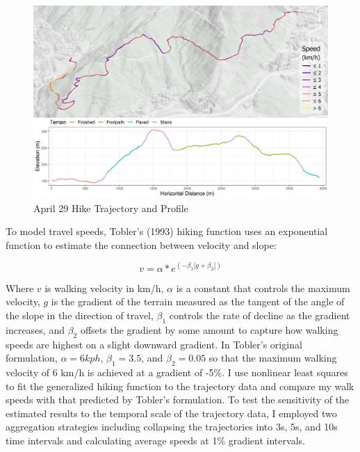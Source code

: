 \documentclass{article}
\begin{document}
\begin{figure}
\includegraphics[width=1\linewidth]{./img/Fig_1} \caption{April 29 Hike Trajectory and Profile}\label{fig:fig 1}
\end{figure}

To model travel speeds, Tobler's (1993) hiking function uses an
exponential function to estimate the connection between velocity and
slope:

\[
v = \alpha * e^{(-\beta_1 |g + \beta_2|)}
\]

Where \(v\) is walking velocity in km/h, \(\alpha\) is a constant that
controls the maximum velocity, \(g\) is the gradient of the terrain
measured as the tangent of the angle of the slope in the direction of
travel, \(\beta_1\) controls the rate of decline as the gradient
increases, and \(\beta_2\) offsets the gradient by some amount to
capture how walking speeds are highest on a slight downward gradient. In
Tobler's original formulation, \(\alpha = 6 kph\), \(\beta_1 = 3.5\),
and \(\beta_2 = 0.05\) so that the maximum walking velocity of 6 km/h is
achieved at a gradient of -5\%. I use nonlinear least squares to fit the
generalized hiking function to the trajectory data and compare my walk
speeds with that predicted by Tobler's formulation. To test the
sensitivity of the estimated results to the temporal scale of the
trajectory data, I employed two aggregation strategies including
collapsing the trajectories into 3s, 5s, and 10s time intervals and
calculating average speeds at 1\% gradient intervals.
\end{document}
